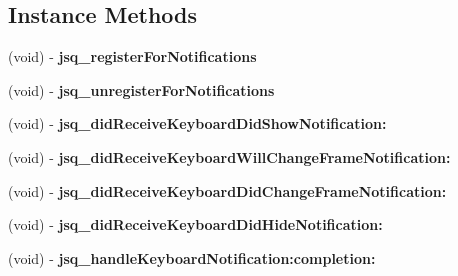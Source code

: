 \subsection*{Instance Methods}
\begin{DoxyCompactItemize}
\item 
\hypertarget{category_j_s_q_messages_keyboard_controller_07_08_ac89d5e4e3fd179820af03fa5a54c1b08}{}(void) -\/ {\bfseries jsq\+\_\+register\+For\+Notifications}\label{category_j_s_q_messages_keyboard_controller_07_08_ac89d5e4e3fd179820af03fa5a54c1b08}

\item 
\hypertarget{category_j_s_q_messages_keyboard_controller_07_08_a0c767e57bfb6a0b523f2ab67769752e9}{}(void) -\/ {\bfseries jsq\+\_\+unregister\+For\+Notifications}\label{category_j_s_q_messages_keyboard_controller_07_08_a0c767e57bfb6a0b523f2ab67769752e9}

\item 
\hypertarget{category_j_s_q_messages_keyboard_controller_07_08_a749ce9a386e2c84a3b47e55b58b39b1c}{}(void) -\/ {\bfseries jsq\+\_\+did\+Receive\+Keyboard\+Did\+Show\+Notification\+:}\label{category_j_s_q_messages_keyboard_controller_07_08_a749ce9a386e2c84a3b47e55b58b39b1c}

\item 
\hypertarget{category_j_s_q_messages_keyboard_controller_07_08_a6a851a3d08931f65e7c1b2d618f07fd5}{}(void) -\/ {\bfseries jsq\+\_\+did\+Receive\+Keyboard\+Will\+Change\+Frame\+Notification\+:}\label{category_j_s_q_messages_keyboard_controller_07_08_a6a851a3d08931f65e7c1b2d618f07fd5}

\item 
\hypertarget{category_j_s_q_messages_keyboard_controller_07_08_af8ab4f7b01395cbb8b93cd8de0bdee8f}{}(void) -\/ {\bfseries jsq\+\_\+did\+Receive\+Keyboard\+Did\+Change\+Frame\+Notification\+:}\label{category_j_s_q_messages_keyboard_controller_07_08_af8ab4f7b01395cbb8b93cd8de0bdee8f}

\item 
\hypertarget{category_j_s_q_messages_keyboard_controller_07_08_a627f9408ddab0313be82d7ceb9cc4d6d}{}(void) -\/ {\bfseries jsq\+\_\+did\+Receive\+Keyboard\+Did\+Hide\+Notification\+:}\label{category_j_s_q_messages_keyboard_controller_07_08_a627f9408ddab0313be82d7ceb9cc4d6d}

\item 
\hypertarget{category_j_s_q_messages_keyboard_controller_07_08_a6c7fefb741aa82c8103c815d44b05c05}{}(void) -\/ {\bfseries jsq\+\_\+handle\+Keyboard\+Notification\+:completion\+:}\label{category_j_s_q_messages_keyboard_controller_07_08_a6c7fefb741aa82c8103c815d44b05c05}


\end{DoxyCompactItemize}
